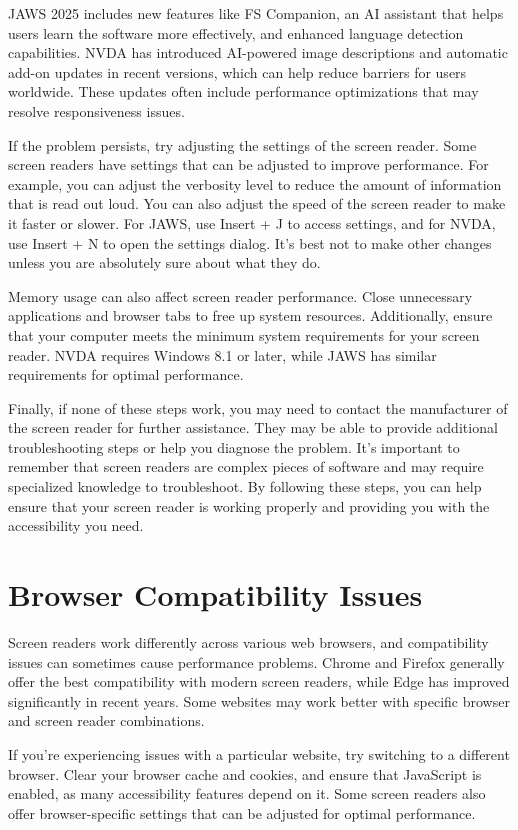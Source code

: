JAWS 2025 includes new features like FS Companion, an AI assistant that helps users learn the software more effectively, and enhanced language detection capabilities. NVDA has introduced AI-powered image descriptions and automatic add-on updates in recent versions, which can help reduce barriers for users worldwide. These updates often include performance optimizations that may resolve responsiveness issues.

If the problem persists, try adjusting the settings of the screen reader. Some screen readers have settings that can be adjusted to improve performance. For example, you can adjust the verbosity level to reduce the amount of information that is read out loud. You can also adjust the speed of the screen reader to make it faster or slower. For JAWS, use Insert + J to access settings, and for NVDA, use Insert + N to open the settings dialog. It's best not to make other changes unless you are absolutely sure about what they do.

Memory usage can also affect screen reader performance. Close unnecessary applications and browser tabs to free up system resources. Additionally, ensure that your computer meets the minimum system requirements for your screen reader. NVDA requires Windows 8.1 or later, while JAWS has similar requirements for optimal performance.

Finally, if none of these steps work, you may need to contact the manufacturer of the screen reader for further assistance. They may be able to provide additional troubleshooting steps or help you diagnose the problem. It's important to remember that screen readers are complex pieces of software and may require specialized knowledge to troubleshoot. By following these steps, you can help ensure that your screen reader is working properly and providing you with the accessibility you need.

\section{Browser Compatibility Issues}\label{browser}
Screen readers work differently across various web browsers, and compatibility issues can sometimes cause performance problems. Chrome and Firefox generally offer the best compatibility with modern screen readers, while Edge has improved significantly in recent years. Some websites may work better with specific browser and screen reader combinations.

If you're experiencing issues with a particular website, try switching to a different browser. Clear your browser cache and cookies, and ensure that JavaScript is enabled, as many accessibility features depend on it. Some screen readers also offer browser-specific settings that can be adjusted for optimal performance.


